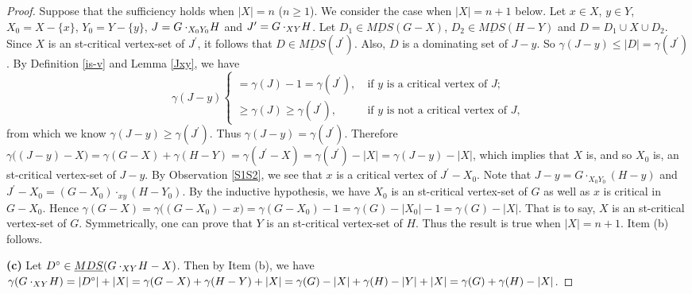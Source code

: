 \documentclass[a4paper,11pt]{article}
\numberwithin{equation}{section}
\begin{document}
\begin{proof}
Suppose that the sufficiency holds when $|X|=n$ ($n\geq1$). We consider the case when $|X|=n+1$ below. Let $x \in X$, $y\in Y$, $X_0=X-\{x\}$, $Y_0=Y-\{y\}$, $J=G\cdot_{X_0Y_0}\negmedspace H$ and $J^{\prime}=G\cdot_{XY}\negmedspace H$. Let $D_1\in \underline{MDS}(G-X)$, $D_2\in \underline{MDS}(H-Y)$ and $D=D_1\cup X \cup D_2$. Since $X$ is an st-critical vertex-set of $J^{\prime}$, it follows that $D\in \underline{MDS}(J^{\prime})$. Also, $D$ is a dominating set of $J-y$. So $\gamma(J-y)\leq|D|=\gamma(J^{\prime})$.  By Definition \ref{is-v} and Lemma \ref{Jxy}, we have
\begin{equation*}
\gamma(J-y)
\begin{cases}
=\gamma(J)-1=\gamma(J^{\prime}), &~\text{if~$y$ is a critical vertex of $J$;}\\
\geq\gamma(J)\geq\gamma(J^{\prime}), &~\text{if~$y$ is not a critical vertex of $J$,}
\end{cases}
\end{equation*}
 from which we know $\gamma(J-y)\geq\gamma(J^{\prime})$. Thus $\gamma(J-y)=\gamma(J^{\prime})$. Therefore $\gamma\big((J-y)-X\big)=\gamma(G-X)+\gamma(H-Y)=\gamma(J^{\prime}-X)=\gamma(J^{\prime})-|X|=\gamma(J-y)-|X|$, which implies that $X$ is, and so $X_0$ is, an st-critical vertex-set of $J-y$. By Observation \ref{S1S2}, we see that $x$ is a   critical vertex of $J^{\prime}-X_0$. Note that $J-y=G\cdot_{X_0Y_0}(H-y)$ and $J^{\prime}-X_0=(G-X_0)\cdot_{xy}(H-Y_0)$.  By the inductive hypothesis, we have $X_0$ is an st-critical vertex-set of $G$ as well as $x$ is critical in $G-X_0$. Hence $\gamma(G-X)=\gamma\big((G-X_0)-x\big)=\gamma(G-X_0)-1=\gamma(G)-|X_0|-1=\gamma(G)-|X|$. That is to say, $X$ is an st-critical vertex-set of $G$. Symmetrically, one can prove that  $Y$ is an st-critical vertex-set of $H$.
Thus the result is true when $|X|=n+1$. Item (b) follows.

\smallskip
\textbf{(c)} Let $D^{\circ}\in\underline{MDS}(G\cdot_{XY}\negthinspace H-X)$. Then by Item (b), we have $\gamma(G\cdot_{XY}\negthinspace H)=|D^{\circ}|+|X|=\gamma(G-X)+\gamma(H-Y)+|X|=\gamma(G)-|X|+\gamma(H)-|Y|+|X|=\gamma(G)+\gamma(H)-|X|$.
\end{proof}
\end{document}
